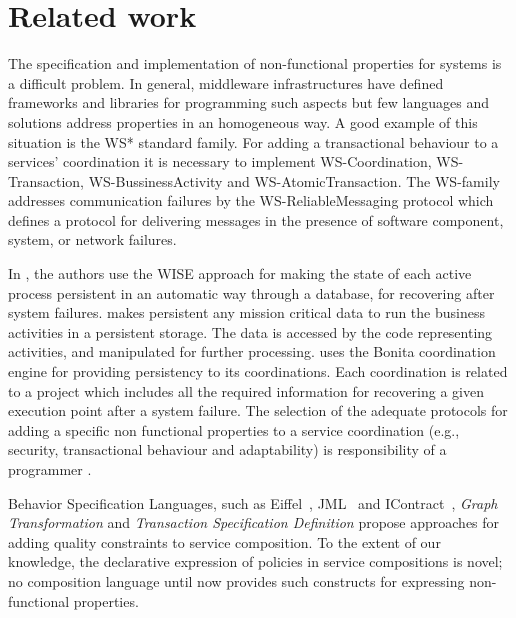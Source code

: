\documentclass{sig-alternate}
\begin{document}
\section{Related work} 
 
The specification and implementation of non-functional properties for systems is a difficult problem. 
In general, middleware infrastructures have defined frameworks and libraries for programming such aspects but few languages and solutions address properties in an homogeneous way. 
A good example of this situation is the WS* standard family.  
For adding a transactional behaviour to a services' coordination it is necessary
to implement WS-Coordination, WS-Transaction, WS-BussinessActivity and
WS-AtomicTransaction. The WS-family addresses communication failures by
the WS-ReliableMessaging protocol \cite{ws-ra} which defines a protocol for
delivering messages in the presence of software component, system, or network failures. 

In \cite{schuldt-etal-TODS}, the authors use the WISE approach
\cite{alonso99wise,lazcano00wise} for making the state of each active process
persistent in an automatic way through a database, for recovering after system
failures. \cite{NepalFGJKS05} makes persistent any mission critical data to run
the business activities in a persistent storage. The data is accessed by the
code representing activities, and manipulated for further processing.
\cite{samy} uses the Bonita coordination engine \cite{Bonita} for providing
persistency to its coordinations. Each coordination is related to a project
which includes all the required information for recovering a given execution
point after a system failure. The selection of the adequate protocols for adding
a specific non functional properties to a service coordination (e.g., security,
transactional behaviour and adaptability) is responsibility of a programmer
\cite{Espinosa-OviedoVZC09}.
 

Behavior Specification Languages, such as Eiffel~\cite{Meyer98a}, JML~\cite{burdy:05} and IContract~\cite{LacknerKP02}, \textit{Graph Transformation} \cite{HL05TACoS, LeS92} and \textit{Transaction Specification Definition}
\cite{PiresBM02, Hernandez-BaruchPZ07, Haddad08} propose approaches for adding quality constraints to service composition. 
To the extent of our knowledge, the declarative expression of policies in
service compositions is novel; no composition language until now provides such
constructs for expressing non-functional properties.
\end{document}
